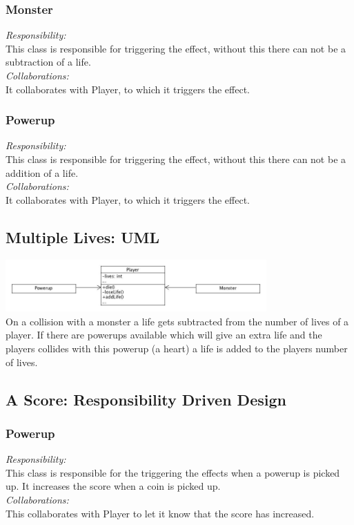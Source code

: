 \subsubsection{Monster}
\textit{Responsibility:} \\
This class is responsible for triggering the effect, without this there can not be a subtraction of a life. \\
\textit{Collaborations:} \\
It collaborates with Player, to which it triggers the effect.

\subsubsection{Powerup}
\textit{Responsibility:} \\
This class is responsible for triggering the effect, without this there can not be a addition of a life. \\
\textit{Collaborations:} \\
It collaborates with Player, to which it triggers the effect.

\subsection{Multiple Lives: UML}

\includegraphics[width=100mm]{uml_multiple_lives.jpg}\\[1cm]
On a collision with a monster a life gets subtracted from the number of lives of a player. If there are powerups available which will give an extra life and the players collides with this powerup (a heart) a life is added to the players number of lives.

\subsection{A Score: Responsibility Driven Design}


\subsubsection{Powerup}
\textit{Responsibility:} \\
This class is responsible for the triggering the effects when a powerup is picked up. It increases the score when a coin is picked up. \\
\textit{Collaborations:} \\
This collaborates with Player to let it know that the score has increased. 

